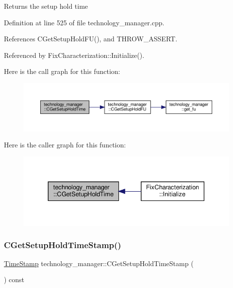 \begin{DoxyReturn}{Returns}
the setup hold time 
\end{DoxyReturn}


Definition at line 525 of file technology\+\_\+manager.\+cpp.



References C\+Get\+Setup\+Hold\+F\+U(), and T\+H\+R\+O\+W\+\_\+\+A\+S\+S\+E\+RT.



Referenced by Fix\+Characterization\+::\+Initialize().

Here is the call graph for this function\+:
\nopagebreak
\begin{figure}[H]
\begin{center}
\leavevmode
\includegraphics[width=350pt]{df/dc7/classtechnology__manager_ab25d130e2a4fe506fcb50d5c0f46d8bd_cgraph}
\end{center}
\end{figure}
Here is the caller graph for this function\+:
\nopagebreak
\begin{figure}[H]
\begin{center}
\leavevmode
\includegraphics[width=330pt]{df/dc7/classtechnology__manager_ab25d130e2a4fe506fcb50d5c0f46d8bd_icgraph}
\end{center}
\end{figure}
\mbox{\label{classtechnology__manager_a4e1d25b7ad4c37cae201f371a7c4a9a1}} 
\subsubsection{\texorpdfstring{C\+Get\+Setup\+Hold\+Time\+Stamp()}{CGetSetupHoldTimeStamp()}}
{\footnotesize\ttfamily \hyperlink{structTimeStamp}{Time\+Stamp} technology\+\_\+manager\+::\+C\+Get\+Setup\+Hold\+Time\+Stamp (\begin{DoxyParamCaption}{ }\end{DoxyParamCaption}) const}



